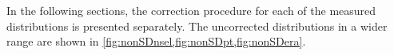 In the following sections, the correction procedure   for each of the measured distributions is presented separately.
The uncorrected distributions in a wider range  are shown in \cref{fig:nonSDnsel,fig:nonSDpt,fig:nonSDera}.






